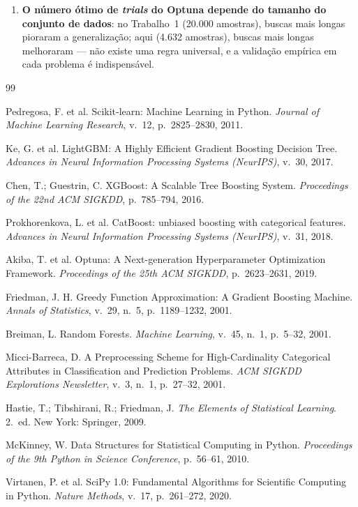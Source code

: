 \documentclass[12pt, a4paper]{article}
\begin{document}
\begin{enumerate}[leftmargin=2em]
  \item \textbf{O número ótimo de \textit{trials} do Optuna depende do tamanho do conjunto de dados}: no Trabalho~1 (20.000 amostras), buscas mais longas pioraram a generalização; aqui (4.632 amostras), buscas mais longas melhoraram --- não existe uma regra universal, e a validação empírica em cada problema é indispensável.
\end{enumerate}

\newpage
\begin{thebibliography}{99}

Pedregosa, F. et al. Scikit-learn: Machine Learning in Python. \textit{Journal of Machine Learning Research}, v.~12, p.~2825--2830, 2011.

Ke, G. et al. LightGBM: A Highly Efficient Gradient Boosting Decision Tree. \textit{Advances in Neural Information Processing Systems (NeurIPS)}, v.~30, 2017.

Chen, T.; Guestrin, C. XGBoost: A Scalable Tree Boosting System. \textit{Proceedings of the 22nd ACM SIGKDD}, p.~785--794, 2016.

Prokhorenkova, L. et al. CatBoost: unbiased boosting with categorical features. \textit{Advances in Neural Information Processing Systems (NeurIPS)}, v.~31, 2018.

Akiba, T. et al. Optuna: A Next-generation Hyperparameter Optimization Framework. \textit{Proceedings of the 25th ACM SIGKDD}, p.~2623--2631, 2019.

Friedman, J. H. Greedy Function Approximation: A Gradient Boosting Machine. \textit{Annals of Statistics}, v.~29, n.~5, p.~1189--1232, 2001.

Breiman, L. Random Forests. \textit{Machine Learning}, v.~45, n.~1, p.~5--32, 2001.

Micci-Barreca, D. A Preprocessing Scheme for High-Cardinality Categorical Attributes in Classification and Prediction Problems. \textit{ACM SIGKDD Explorations Newsletter}, v.~3, n.~1, p.~27--32, 2001.

Hastie, T.; Tibshirani, R.; Friedman, J. \textit{The Elements of Statistical Learning}. 2.~ed. New York: Springer, 2009.

McKinney, W. Data Structures for Statistical Computing in Python. \textit{Proceedings of the 9th Python in Science Conference}, p.~56--61, 2010.

Virtanen, P. et al. SciPy 1.0: Fundamental Algorithms for Scientific Computing in Python. \textit{Nature Methods}, v.~17, p.~261--272, 2020.

\end{thebibliography}
\end{document}
